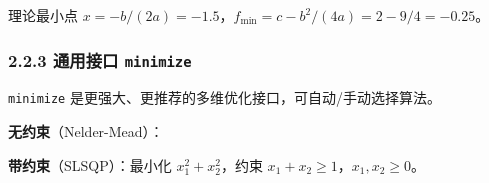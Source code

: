 \begin{Shaded}
\begin{Highlighting}[]
\end{Highlighting}
\end{Shaded}

理论最小点 \(x=-b/(2a)=-1.5\)，\(f_{\min}=c-b^2/(4a)=2-9/4=-0.25\)。

\subsubsection{\texorpdfstring{2.2.3 通用接口
\texttt{minimize}}{2.2.3 通用接口 minimize}}\label{ux901aux7528ux63a5ux53e3-minimize}

\texttt{minimize} 是更强大、更推荐的多维优化接口，可自动/手动选择算法。

\textbf{无约束}（Nelder-Mead）：

\begin{Shaded}
\begin{Highlighting}[]

    \NormalTok{ (x[}\NormalTok{]}\OperatorTok{{-}}\NormalTok{)}\OperatorTok{**} \OperatorTok{+}\NormalTok{ (x[}\NormalTok{]}\OperatorTok{{-}}\NormalTok{)}\OperatorTok{**}

\OperatorTok{=}\NormalTok{ minimize(obj, [}\NormalTok{, }\NormalTok{], method}\OperatorTok{=}\NormalTok{)}
\end{Highlighting}
\end{Shaded}

\begin{Shaded}
\begin{Highlighting}[]
\end{Highlighting}
\end{Shaded}

\textbf{带约束}（SLSQP）：最小化 \(x_1^2+x_2^2\)，约束
\(x_1+x_2\ge1\)，\(x_1,x_2\ge0\)。

